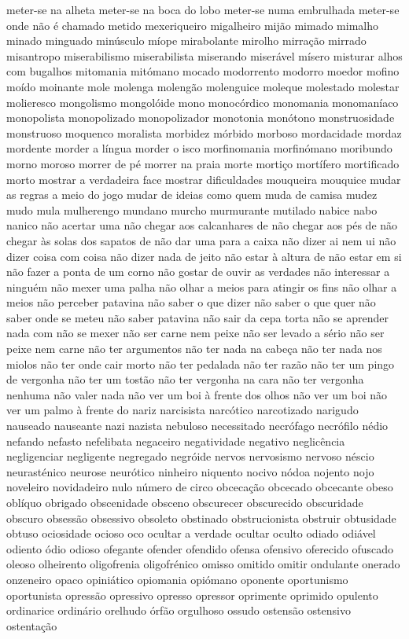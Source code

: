 \documentclass[ruledheader]{abnt_UFF}
\begin{document}
meter-se na alheta meter-se na boca do lobo meter-se numa embrulhada meter-se onde n\~ao \'{e} chamado metido mexeriqueiro migalheiro mij\~ao mimado mimalho minado minguado min\'{u}sculo m\'{i}ope mirabolante mirolho mirra\c{c}\~ao mirrado misantropo miserabilismo miserabilista miserando miser\'{a}vel m\'{i}sero misturar alhos com bugalhos mitomania mit\'{o}mano mocado modorrento modorro moedor mofino mo\'{i}do moinante mole molenga moleng\~ao molenguice moleque molestado molestar molieresco mongolismo mongol\'{o}ide mono monoc\'{o}rdico monomania monoman\'{i}aco monopolista monopolizado monopolizador monotonia mon\'{o}tono monstruosidade monstruoso moquenco moralista morbidez m\'{o}rbido morboso mordacidade mordaz mordente morder a l\'{i}ngua morder o isco morfinomania morfin\'{o}mano moribundo morno moroso morrer de p\'{e} morrer na praia morte morti\c{c}o mort\'{i}fero mortificado morto mostrar a verdadeira face mostrar dificuldades mouqueira mouquice mudar as regras a meio do jogo mudar de ideias como quem muda de camisa mudez mudo mula mulherengo mundano murcho murmurante mutilado nabice nabo nanico n\~ao acertar uma n\~ao chegar aos calcanhares de n\~ao chegar aos p\'{e}s de n\~ao chegar \`{a}s solas dos sapatos de n\~ao dar uma para a caixa n\~ao dizer ai nem ui n\~ao dizer coisa com coisa n\~ao dizer nada de jeito n\~ao estar \`{a} altura de n\~ao estar em si n\~ao fazer a ponta de um corno n\~ao gostar de ouvir as verdades n\~ao interessar a ningu\'{e}m n\~ao mexer uma palha n\~ao olhar a meios para atingir os fins n\~ao olhar a meios n\~ao perceber patavina n\~ao saber o que dizer n\~ao saber o que quer n\~ao saber onde se meteu n\~ao saber patavina n\~ao sair da cepa torta n\~ao se aprender nada com n\~ao se mexer n\~ao ser carne nem peixe n\~ao ser levado a s\'{e}rio n\~ao ser peixe nem carne n\~ao ter argumentos n\~ao ter nada na cabe\c{c}a n\~ao ter nada nos miolos n\~ao ter onde cair morto n\~ao ter pedalada n\~ao ter raz\~ao n\~ao ter um pingo de vergonha n\~ao ter um tost\~ao n\~ao ter vergonha na cara n\~ao ter vergonha nenhuma n\~ao valer nada n\~ao ver um boi \`{a} frente dos olhos n\~ao ver um boi n\~ao ver um palmo \`{a} frente do nariz narcisista narc\'{o}tico narcotizado narigudo nauseado nauseante nazi nazista nebuloso necessitado necr\'{o}fago necr\'{o}filo n\'{e}dio nefando nefasto nefelibata negaceiro negatividade negativo neglic\^{e}ncia negligenciar negligente negregado negr\'{o}ide nervos nervosismo nervoso n\'{e}scio neurast\'{e}nico neurose neur\'{o}tico ninheiro niquento nocivo n\'{o}doa nojento nojo noveleiro novidadeiro nulo n\'{u}mero de circo obceca\c{c}\~ao obcecado obcecante obeso obl\'{i}quo obrigado obscenidade obsceno obscurecer obscurecido obscuridade obscuro obsess\~ao obsessivo obsoleto obstinado obstrucionista obstruir obtusidade obtuso ociosidade ocioso oco ocultar a verdade ocultar oculto odiado odi\'{a}vel odiento \'{o}dio odioso ofegante ofender ofendido ofensa ofensivo oferecido ofuscado oleoso olheirento oligofrenia oligofr\'{e}nico omisso omitido omitir ondulante onerado onzeneiro opaco opini\'{a}tico opiomania opi\'{o}mano oponente oportunismo oportunista opress\~ao opressivo opresso opressor oprimente oprimido opulento ordinarice ordin\'{a}rio orelhudo \'{o}rf\~ao orgulhoso ossudo ostens\~ao ostensivo ostenta\c{c}\~ao 
\end{document}
